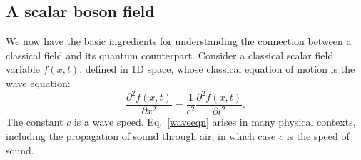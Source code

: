 \documentclass[prx,12pt]{revtex4-2}
\begin{document}
\subsection{A scalar boson field}
\label{sec:scalar_boson}

We now have the basic ingredients for understanding the connection
between a classical field and its quantum counterpart.  Consider a
classical scalar field variable $f(x,t)$, defined in 1D space, whose
classical equation of motion is the wave equation:
\begin{equation}
  \frac{\partial^2\! f(x,t)}{\partial x^2}
  = \frac{1}{c^2} \frac{\partial^2\! f(x,t)}{\partial t^2}.
  \label{waveeqn}
\end{equation}
The constant $c$ is a wave speed.  Eq.~\eqref{waveeqn} arises in many
physical contexts, including the propagation of sound through air, in
which case $c$ is the speed of sound.
\end{document}
